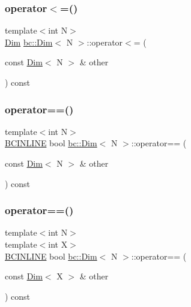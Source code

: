 \mbox{\label{structbc_1_1Dim_a04297e95814d27fee5009eac3ed82082}} 
\subsubsection{\texorpdfstring{operator$<$=()}{operator<=()}}
{\footnotesize\ttfamily template$<$int N$>$ \\
\hyperlink{structbc_1_1Dim}{Dim} \hyperlink{structbc_1_1Dim}{bc\+::\+Dim}$<$ N $>$\+::operator$<$= (\begin{DoxyParamCaption}\item[{const \hyperlink{structbc_1_1Dim}{Dim}$<$ N $>$ \&}]{other }\end{DoxyParamCaption}) const\hspace{0.3cm}{\ttfamily [inline]}}

\mbox{\label{structbc_1_1Dim_a67f98070634cf6f6b7bc1dfdd37cf63f}} 
\subsubsection{\texorpdfstring{operator==()}{operator==()}\hspace{0.1cm}{\footnotesize\ttfamily [1/2]}}
{\footnotesize\ttfamily template$<$int N$>$ \\
\hyperlink{common_8h_a6699e8b0449da5c0fafb878e59c1d4b1}{B\+C\+I\+N\+L\+I\+NE} bool \hyperlink{structbc_1_1Dim}{bc\+::\+Dim}$<$ N $>$\+::operator== (\begin{DoxyParamCaption}\item[{const \hyperlink{structbc_1_1Dim}{Dim}$<$ N $>$ \&}]{other }\end{DoxyParamCaption}) const\hspace{0.3cm}{\ttfamily [inline]}}

\mbox{\label{structbc_1_1Dim_a98ff3a660021beef1a5e0326a7704f94}} 
\subsubsection{\texorpdfstring{operator==()}{operator==()}\hspace{0.1cm}{\footnotesize\ttfamily [2/2]}}
{\footnotesize\ttfamily template$<$int N$>$ \\
template$<$int X$>$ \\
\hyperlink{common_8h_a6699e8b0449da5c0fafb878e59c1d4b1}{B\+C\+I\+N\+L\+I\+NE} bool \hyperlink{structbc_1_1Dim}{bc\+::\+Dim}$<$ N $>$\+::operator== (\begin{DoxyParamCaption}\item[{const \hyperlink{structbc_1_1Dim}{Dim}$<$ X $>$ \&}]{other }\end{DoxyParamCaption}) const\hspace{0.3cm}{\ttfamily [inline]}}

